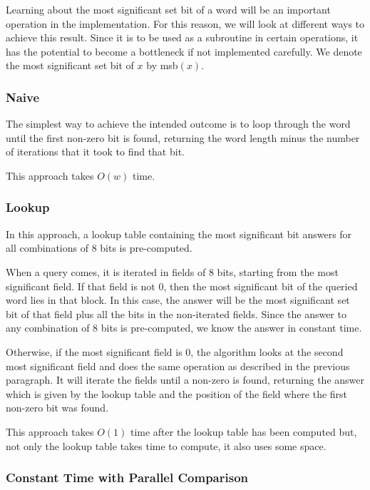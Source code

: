 Learning about the most significant set bit of a word will be an important operation in the implementation. For this reason, we will look at different ways to achieve this result. Since it is to be used as a subroutine in certain operations, it has the potential to become a bottleneck if not implemented carefully. We denote the most significant set bit of $x$ by msb$(x)$.

\subsubsection{Naive}

The simplest way to achieve the intended outcome is to loop through the word until the first non-zero bit is found, returning the word length minus the number of iterations that it took to find that bit.

This approach takes $O(w)$ time.

\subsubsection{Lookup}

In this approach, a lookup table containing the most significant bit answers for all combinations of 8 bits is pre-computed.

When a query comes, it is iterated in fields of 8 bits, starting from the most significant field. If that field is not $0$, then the most significant bit of the queried word lies in that block.
In this case, the answer will be the most significant set bit of that field plus all the bits in the non-iterated fields. Since the answer to any combination of 8 bits is pre-computed, we know the answer in constant time.

Otherwise, if the most significant field is $0$, the algorithm looks at the second most significant field and does the same operation as described in the previous paragraph.
It will iterate the fields until a non-zero is found, returning the answer which is given by the lookup table and the position of the field where the first non-zero bit was found.

This approach takes $O(1)$ time after the lookup table has been computed but, not only the lookup table takes time to compute, it also uses some space.

\subsubsection{Constant Time with Parallel Comparison} \label{sec:msbO1}

